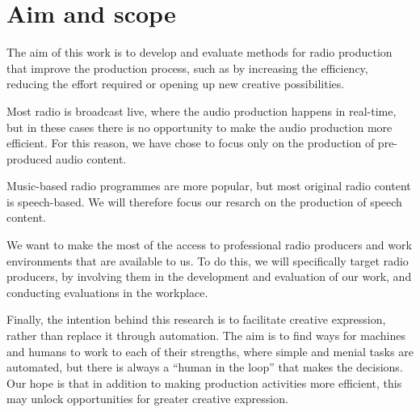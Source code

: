 
\section{Aim and scope}\label{sec:aim}

The aim of this work is to develop and evaluate methods for radio production that improve the production process, such
as by increasing the efficiency, reducing the effort required or opening up new creative possibilities.

Most radio is broadcast live, where the audio production happens in real-time, but in these cases there is no
opportunity to make the audio production more efficient. For this reason, we have chose to focus only on the production
of pre-produced audio content.

Music-based radio programmes are more popular, but most original radio content is speech-based. We will therefore
focus our resarch on the production of speech content.

We want to make the most of the access to professional radio producers and work environments that are available to us.
To do this, we will specifically target radio producers, by involving them in the development and evaluation of our
work, and conducting evaluations in the workplace.


Finally, the intention behind this research is to facilitate creative expression, rather than replace it through
automation.  The aim is to find ways for machines and humans to work to each of their strengths, where simple and
menial tasks are automated, but there is always a ``human in the loop'' that makes the decisions.  Our hope is
that in addition to making production activities more efficient, this may unlock opportunities for greater creative
expression.

